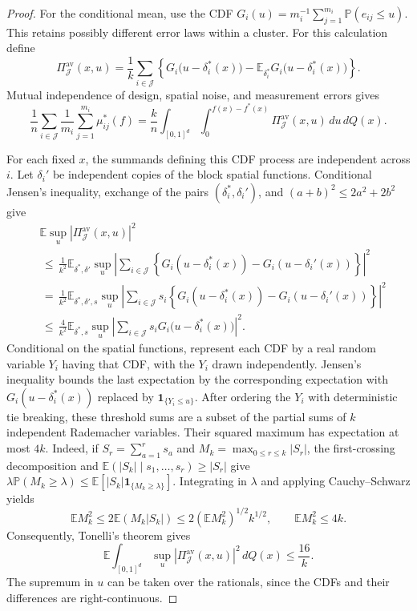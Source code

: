 \documentclass[twoside,11pt]{article}
\newenvironment{revision}{\color{revisionred}}{}
\begin{document}
\begin{revision}
\begin{proof}
For the conditional mean, use the CDF
$G_i(u)=m_i^{-1}\sum_{j=1}^{m_i}\mathbb P(e_{ij}\leq u)$.
This retains possibly different error laws within a cluster.
For this calculation define
\[
\Pi_{\mathcal J}^{\mathrm{av}}(x,u)
=\frac1k\sum_{i\in\mathcal J}
\left\{G_i\bigl(u-\delta_i^*(x)\bigr)
-\mathbb E_{\delta_i^*}G_i\bigl(u-\delta_i^*(x)\bigr)\right\}.
\]
Mutual independence of design, spatial noise, and measurement
errors gives
\begin{equation}
\label{eq_E1_weighted_mean}
\frac1n\sum_{i\in\mathcal J}\frac1{m_i}
\sum_{j=1}^{m_i}\mu_{ij}^*(f)
=\frac{k}{n}\int_{[0,1]^d}
\int_0^{f(x)-f^*(x)}
\Pi_{\mathcal J}^{\mathrm{av}}(x,u)\,du\,dQ(x).
\end{equation}

For each fixed $x$, the summands defining this CDF process are
independent across $i$. Let $\delta_i'$ be independent copies of
the block spatial functions. Conditional Jensen's inequality,
exchange of the pairs $(\delta_i^*,\delta_i')$, and
$(a+b)^2\leq2a^2+2b^2$ give
\begin{align*}
&\mathbb E\sup_u|\Pi_{\mathcal J}^{\mathrm{av}}(x,u)|^2\\
&\,\leq\,\frac1{k^2}\mathbb E_{\delta^*,\delta'}
\sup_u\left|\sum_{i\in\mathcal J}
\left\{G_i(u-\delta_i^*(x))-G_i(u-\delta_i'(x))\right\}\right|^2\\
&\,=\,\frac1{k^2}\mathbb E_{\delta^*,\delta',s}
\sup_u\left|\sum_{i\in\mathcal J}s_i
\left\{G_i(u-\delta_i^*(x))-G_i(u-\delta_i'(x))\right\}\right|^2\\
&\,\leq\,\frac4{k^2}\mathbb E_{\delta^*,s}
\sup_u\left|\sum_{i\in\mathcal J}
s_iG_i\bigl(u-\delta_i^*(x)\bigr)\right|^2.
\end{align*}
Conditional on the spatial functions, represent each CDF by a
real random variable $Y_i$ having that CDF, with the $Y_i$ drawn
independently. Jensen's inequality bounds the last expectation
by the corresponding expectation with
$G_i(u-\delta_i^*(x))$ replaced by $\mathbf 1_{\{Y_i\leq u\}}$.
After ordering the $Y_i$ with deterministic tie breaking,
these threshold sums are a subset of the partial sums of $k$
independent Rademacher variables. Their squared maximum has
expectation at most $4k$. Indeed, if
$S_r=\sum_{a=1}^rs_a$ and $M_k=\max_{0\leq r\leq k}|S_r|$,
the first-crossing decomposition and
$\mathbb E(|S_k|\mid s_1,\ldots,s_r)\geq|S_r|$ give
$\lambda\mathbb P(M_k\geq\lambda)
\leq\mathbb E[|S_k|\mathbf 1_{\{M_k\geq\lambda\}}]$.
Integrating in $\lambda$ and applying Cauchy--Schwarz yields
\[
\mathbb E M_k^2
\leq2\mathbb E(M_k|S_k|)
\leq2(\mathbb E M_k^2)^{1/2}k^{1/2},
\qquad
\mathbb E M_k^2\leq4k.
\]
Consequently, Tonelli's theorem gives
\begin{equation}
\label{eq_E1_cdf_second_moment}
\mathbb E\int_{[0,1]^d}
\sup_u|\Pi_{\mathcal J}^{\mathrm{av}}(x,u)|^2\,dQ(x)
\leq\frac{16}{k}.
\end{equation}
The supremum in $u$ can be taken over the rationals, since the
CDFs and their differences are right-continuous.


\end{proof}
\end{revision}
\end{document}
